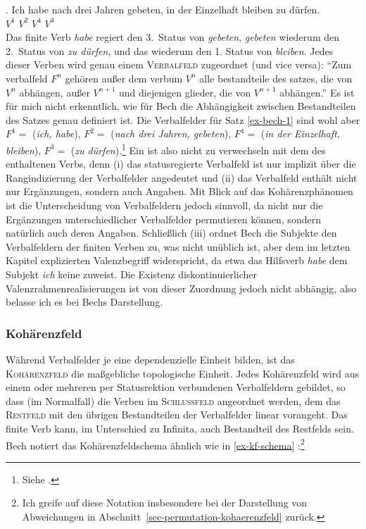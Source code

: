 \exg. Ich habe nach drei Jahren gebeten, in der Einzelhaft bleiben {zu dürfen}.\\
{} $V^1$ {} {} {} $V^2$ {} {} {} $V^4$ $V^3$\label{ex-bech-1}\\
 
Das finite Verb {\it habe} regiert den 3.~Status von {\it gebeten}, {\it gebeten} wiederum den 2.~Status von {\it zu dürfen}, und das wiederum den 1. Status von {\it bleiben}. Jedes dieser Verben wird genau einem \textsc{Verbalfeld} zugeordnet (und vice versa): "`Zum verbalfeld $F^n$ gehören au\ss er dem verbum $V^n$ alle bestandteile des satzes, die von $V^n$ abhängen, au\ss er $V^{n+1}$ und diejenigen glieder, die von $V^{n+1}$ abhängen."' \citep[\S 36]{Bech:55} Es ist für mich nicht erkenntlich, wie für Bech die Abhängigkeit zwischen Bestandteilen des Satzes genau definiert ist. Die Verbalfelder für Satz \ref{ex-bech-1} sind wohl aber $F^1 =$ ({\it ich, habe}), $F^2 =$ ({\it nach drei Jahren, gebeten}), $F^4 =$ ({\it in der Einzelhaft, bleiben}), $F^3 =$ ({\it zu dürfen}).\footnote{Siehe \citet[\S 22]{Bech:55}.} Ein  ist also nicht zu verwechseln mit dem  des enthaltenen Verbs, denn (i) das statusregierte Verbalfeld ist nur implizit über die Rangindizierung der Verbalfelder angedeutet und (ii) das Verbalfeld enthält nicht nur Ergänzungen, sondern auch Angaben. Mit Blick auf das Kohärenzphänomen ist die Unterscheidung von Verbalfeldern jedoch sinnvoll, da nicht nur die Ergänzungen unterschiedlicher Verbalfelder permutieren können, sondern natürlich auch deren Angaben. Schlie\ss lich (iii) ordnet Bech die Subjekte den Verbalfeldern der finiten Verben zu, was nicht unüblich ist, aber dem im letzten Kapitel explizierten Valenzbegriff widerspricht, da etwa das Hilfsverb {\it habe} dem Subjekt {\it ich} keine  zuweist. Die Existenz diskontinuierlicher Valenzrahmenrealisierungen ist von dieser Zuordnung jedoch nicht abhängig, also belasse ich es bei Bechs Darstellung.  

\subsubsection*{Kohärenzfeld} 

Während Verbalfelder je eine dependenzielle Einheit bilden, ist das \textsc{Kohärenzfeld} die ma\ss gebliche topologische Einheit. Jedes Kohärenzfeld wird aus einem oder mehreren per Statusrektion verbundenen Verbalfeldern gebildet, so dass (im Normalfall) die Verben im \textsc{Schlussfeld} angeordnet werden, dem das \textsc{Restfeld} mit den übrigen Bestandteilen der Verbalfelder linear vorangeht. Das finite Verb kann, im Unterschied zu Infinita, auch Bestandteil des Restfelds sein. Bech notiert das Kohärenzfeldschema ähnlich wie in \ref{ex-kf-schema} \citep[\S 55]{Bech:55}:\footnote{Ich greife auf diese Notation insbesondere bei der Darstellung von Abweichungen in Abschnitt~\ref{sec-permutation-kohaerenzfeld} zurück.}  

